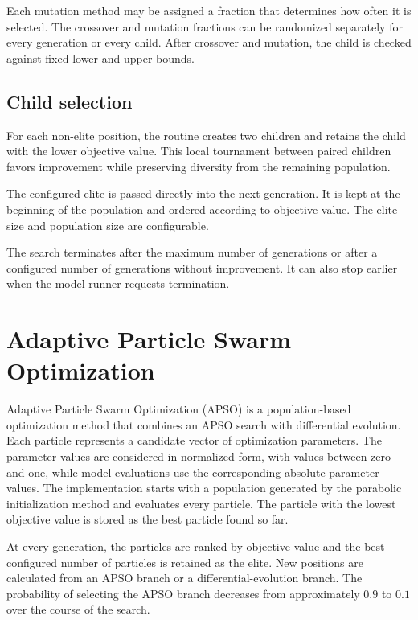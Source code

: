 Each mutation method may be assigned a fraction that determines how often it is selected.
The crossover and mutation fractions can be randomized separately for every generation or every child.
After crossover and mutation, the child is checked against fixed lower and upper bounds.

\subsection{Child selection} \label{sec:ChildSelection}

For each non-elite position, the routine creates two children and retains the child with the lower objective value.
This local tournament between paired children favors improvement while preserving diversity from the remaining population.

The configured elite is passed directly into the next generation.
It is kept at the beginning of the population and ordered according to objective value.
The elite size and population size are configurable.

The search terminates after the maximum number of generations or after a configured number of generations without improvement.
It can also stop earlier when the model runner requests termination.

\section{Adaptive Particle Swarm Optimization} 
\label{sec:APSO}

Adaptive Particle Swarm Optimization (APSO) is a population-based optimization method that combines an APSO search with differential evolution.
Each particle represents a candidate vector of optimization parameters.
The parameter values are considered in normalized form, with values between zero and one, while model evaluations use the corresponding absolute parameter values.
The implementation starts with a population generated by the parabolic initialization method and evaluates every particle.
The particle with the lowest objective value is stored as the best particle found so far.

At every generation, the particles are ranked by objective value and the best configured number of particles is retained as the elite.
New positions are calculated from an APSO branch or a differential-evolution branch.
The probability of selecting the APSO branch decreases from approximately $0.9$ to $0.1$ over the course of the search.

